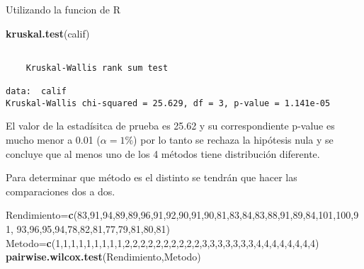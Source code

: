 \documentclass[a4paper,oneside,openany]{book}
\newenvironment{Shaded}{\begin{snugshade}}{\end{snugshade}}
\newcommand{\KeywordTok}[1]{\textcolor[rgb]{0.13,0.29,0.53}{\textbf{#1}}}
\newcommand{\DecValTok}[1]{\textcolor[rgb]{0.00,0.00,0.81}{#1}}
\newcommand{\NormalTok}[1]{#1}
\begin{document}
Utilizando la funcion de R

\begin{Shaded}
\begin{Highlighting}[]
\KeywordTok{kruskal.test}\NormalTok{(calif)}
\end{Highlighting}
\end{Shaded}

\begin{verbatim}

    Kruskal-Wallis rank sum test

data:  calif
Kruskal-Wallis chi-squared = 25.629, df = 3, p-value = 1.141e-05
\end{verbatim}

El valor de la estadísitca de prueba es 25.62 y su correspondiente
p-value es mucho menor a 0.01 (\(\alpha=1\%\)) por lo tanto se rechaza
la hipótesis nula y se concluye que al menos uno de los 4 métodos tiene
distribución diferente.

Para determinar que método es el distinto se tendrán que hacer las
comparaciones dos a dos.

\begin{Shaded}
\begin{Highlighting}[]
\NormalTok{Rendimiento=}\KeywordTok{c}\NormalTok{(}\DecValTok{83}\NormalTok{,}\DecValTok{91}\NormalTok{,}\DecValTok{94}\NormalTok{,}\DecValTok{89}\NormalTok{,}\DecValTok{89}\NormalTok{,}\DecValTok{96}\NormalTok{,}\DecValTok{91}\NormalTok{,}\DecValTok{92}\NormalTok{,}\DecValTok{90}\NormalTok{,}\DecValTok{91}\NormalTok{,}\DecValTok{90}\NormalTok{,}\DecValTok{81}\NormalTok{,}\DecValTok{83}\NormalTok{,}\DecValTok{84}\NormalTok{,}\DecValTok{83}\NormalTok{,}\DecValTok{88}\NormalTok{,}\DecValTok{91}\NormalTok{,}\DecValTok{89}\NormalTok{,}\DecValTok{84}\NormalTok{,}\DecValTok{101}\NormalTok{,}\DecValTok{100}\NormalTok{,}\DecValTok{91}\NormalTok{,}
              \DecValTok{93}\NormalTok{,}\DecValTok{96}\NormalTok{,}\DecValTok{95}\NormalTok{,}\DecValTok{94}\NormalTok{,}\DecValTok{78}\NormalTok{,}\DecValTok{82}\NormalTok{,}\DecValTok{81}\NormalTok{,}\DecValTok{77}\NormalTok{,}\DecValTok{79}\NormalTok{,}\DecValTok{81}\NormalTok{,}\DecValTok{80}\NormalTok{,}\DecValTok{81}\NormalTok{)}
\NormalTok{Metodo=}\KeywordTok{c}\NormalTok{(}\DecValTok{1}\NormalTok{,}\DecValTok{1}\NormalTok{,}\DecValTok{1}\NormalTok{,}\DecValTok{1}\NormalTok{,}\DecValTok{1}\NormalTok{,}\DecValTok{1}\NormalTok{,}\DecValTok{1}\NormalTok{,}\DecValTok{1}\NormalTok{,}\DecValTok{1}\NormalTok{,}\DecValTok{2}\NormalTok{,}\DecValTok{2}\NormalTok{,}\DecValTok{2}\NormalTok{,}\DecValTok{2}\NormalTok{,}\DecValTok{2}\NormalTok{,}\DecValTok{2}\NormalTok{,}\DecValTok{2}\NormalTok{,}\DecValTok{2}\NormalTok{,}\DecValTok{2}\NormalTok{,}\DecValTok{2}\NormalTok{,}\DecValTok{3}\NormalTok{,}\DecValTok{3}\NormalTok{,}\DecValTok{3}\NormalTok{,}\DecValTok{3}\NormalTok{,}\DecValTok{3}\NormalTok{,}\DecValTok{3}\NormalTok{,}\DecValTok{3}\NormalTok{,}\DecValTok{4}\NormalTok{,}\DecValTok{4}\NormalTok{,}\DecValTok{4}\NormalTok{,}\DecValTok{4}\NormalTok{,}\DecValTok{4}\NormalTok{,}\DecValTok{4}\NormalTok{,}\DecValTok{4}\NormalTok{,}\DecValTok{4}\NormalTok{)}
\KeywordTok{pairwise.wilcox.test}\NormalTok{(Rendimiento,Metodo)}
\end{Highlighting}
\end{Shaded}
\end{document}
